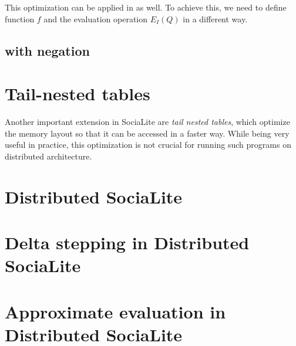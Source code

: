 This optimization can be applied in \datalogra as well. To achieve this, we need to define function $f$ and the evaluation operation $E_I(Q)$ in a different way.




\subsection{\datalogra with negation}


\section{Tail-nested tables}\label{s:tnt}
Another important extension in SociaLite are \emph{tail nested tables}, which optimize the memory layout so that it can be accessed in a faster way. While being very useful in practice, this optimization is not crucial for running such programs on distributed architecture. 

\section{Distributed SociaLite}\label{s:distributed}

\section{Delta stepping in Distributed SociaLite}\label{s:deltastep}

\section{Approximate evaluation in Distributed SociaLite}\label{s:approxdist}




